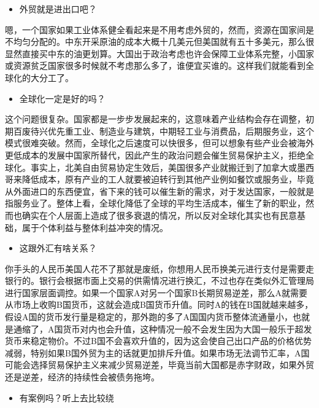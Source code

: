 \documentclass[
  letterpaper,
  DIV=11,
  numbers=noendperiod]{scrreprt}
\providecommand{\tightlist}{%
  \setlength{\itemsep}{0pt}\setlength{\parskip}{0pt}}\usepackage{longtable,booktabs,array}
\begin{document}
\begin{itemize}
\tightlist
\item
  外贸就是进出口吧？
\end{itemize}

嗯，一个国家如果工业体系健全看起来是不用考虑外贸的，然而，资源在国家间是不均匀分配的。中东开采原油的成本大概十几美元但美国就有五十多美元，那么很显然直接买中东的油更划算。大国出于政治考虑也许会保障工业体系完整，小国家或资源贫乏国家很多时候就不考虑那么多了，谁便宜买谁的。这样我们就能看到全球化的大分工了。

\begin{itemize}
\tightlist
\item
  全球化一定是好的吗？
\end{itemize}

这个问题很复杂。国家都是一步步发展起来的，这意味着产业结构会存在调整，初期百废待兴优先重工业、制造业与建筑，中期轻工业与消费品，后期服务业，这个模式很难突破。然而，全球化之后速度可以快很多，但可以想象有些产业会被海外更低成本的发展中国家所替代，因此产生的政治问题会催生贸易保护主义，拒绝全球化。事实上，北美自由贸易协定生效后，美国很多产业就搬迁到了加拿大或墨西哥来降低成本，原有产业的工人就要被迫转行到其他产业例如餐饮或服务业，毕竟从外面进口的东西便宜，省下来的钱可以催生新的需求，对于发达国家，一般就是指服务业了。整体上看，全球化降低了全球的平均生活成本，催生了新的职业，然而也确实在个人层面上造成了很多衰退的情况，所以反对全球化其实也有民意基础，属于个体利益与整体利益冲突的情况。

\begin{itemize}
\tightlist
\item
  这跟外汇有啥关系？
\end{itemize}

你手头的人民币美国人花不了那就是废纸，你想用人民币换美元进行支付是需要走银行的。银行会根据市面上交易的供需情况进行换汇，不过也存在类似外汇管理局进行国家层面调控。如果一个国家A对另一个国家B长期贸易逆差，那么A就需要从市场上收购B国货币，这就会造成B国货币升值。同时A的钱在B国就越来越多，假设A国的货币发行量是稳定的，那外跑的多了A国国内货币整体流通量小，也就是通缩了，A国货币对内也会升值，这种情况一般不会发生因为大国一般乐于超发货币来稳定物价。不过B国不会喜欢升值的，因为这会使自己出口产品的价格优势减弱，特别如果B国外贸为主的话就更加排斥升值。如果市场无法调节汇率，A国可能会选择贸易保护主义来减少贸易逆差，毕竟当前大国都是赤字财政，如果外贸还是逆差，经济的持续性会被债务拖垮。

\begin{itemize}
\tightlist
\item
  有案例吗？听上去比较绕
\end{itemize}
\end{document}

